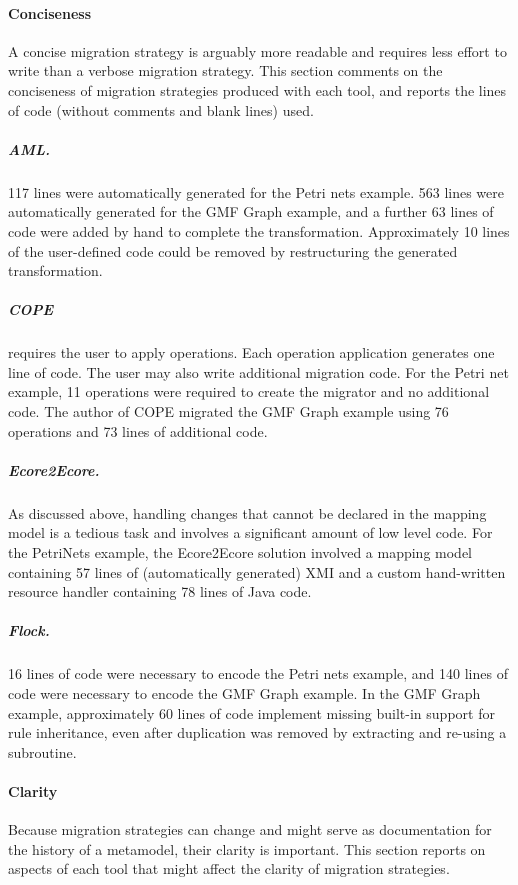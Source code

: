 \paragraph{Conciseness}
A concise migration strategy is arguably more readable and requires less effort to write than a verbose migration strategy. This section comments on the conciseness of migration strategies produced with each tool, and reports the lines of code (without comments and blank lines) used.

\subparagraph{AML.} 117 lines were automatically generated for the Petri nets example. 563 lines were automatically generated for the GMF Graph example, and a further 63 lines of code were added by hand to complete the transformation. Approximately 10 lines of the user-defined code could be removed by restructuring the generated transformation. 

\subparagraph{COPE} requires the user to apply operations. Each operation application generates one line of code. The user may also write additional migration code. For the Petri net example, 11 operations were required to create the migrator and no additional code. The author of COPE migrated the GMF Graph example using 76 operations and 73 lines of additional code.

\subparagraph{Ecore2Ecore.} As discussed above, handling changes that cannot be declared in the mapping model is a tedious task and involves a significant amount of low level code. For the PetriNets example, the Ecore2Ecore solution involved a mapping model containing 57 lines of (automatically generated) XMI and a custom hand-written resource handler containing 78 lines of Java code. 

\subparagraph{Flock.} 16 lines of code were necessary to encode the Petri nets example, and 140 lines of code were necessary to encode the GMF Graph example.
In the GMF Graph example, approximately 60 lines of code implement missing built-in support for rule inheritance, even after duplication was removed by extracting and re-using a subroutine.


\paragraph{Clarity}
Because migration strategies can change and might serve as documentation for the history of a metamodel, their clarity is important. This section reports on aspects of each tool that might affect the clarity of migration strategies.

